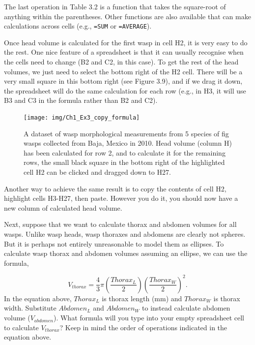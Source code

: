 \documentclass[
]{scrbook}
\begin{document}
The last operation in Table 3.2 is a function that takes the square-root of anything within the parentheses.
Other functions are also available that can make calculations across cells (e.g., \texttt{=SUM} or \texttt{=AVERAGE}).

Once head volume is calculated for the first wasp in cell H2, it is very easy to do the rest.
One nice feature of a spreadsheet is that it can usually recognise when the cells need to change (B2 and C2, in this case).
To get the rest of the head volumes, we just need to select the bottom right of the H2 cell.
There will be a very small square in this bottom right (see Figure 3.9), and if we drag it down, the spreadsheet will do the same calculation for each row (e.g., in H3, it will use B3 and C3 in the formula rather than B2 and C2).

\begin{figure}
\texttt{[image: img/Ch1\_Ex3\_copy\_formula]} \caption{A dataset of wasp morphological measurements from 5 species of fig wasps collected from Baja, Mexico in 2010. Head volume (column H) has been calculated for row 2, and to calculate it for the remaining rows, the small black square in the bottom right of the highlighted cell H2 can be clicked and dragged down to H27.}\label{fig:unnamed-chunk-19}
\end{figure}

Another way to achieve the same result is to copy the contents of cell H2, highlight cells H3-H27, then paste.
However you do it, you should now have a new column of calculated head volume.

Next, suppose that we want to calculate thorax and abdomen volumes for all wasps.
Unlike wasp heads, wasp thoraxes and abdomens are clearly not spheres.
But it is perhaps not entirely unreasonable to model them as ellipses.
To calculate wasp thorax and abdomen volumes assuming an ellipse, we can use the formula,

\[V_{thorax} = \frac{4}{3}\pi \left(\frac{Thorax_{L}}{2}\right)\left(\frac{Thorax_{W}}{2}\right)^{2}.\]
In the equation above, \(Thorax_{L}\) is thorax length (mm) and \(Thorax_{W}\) is thorax width.
Substitute \(Abdomen_{L}\) and \(Abdomen_{W}\) to instead calculate abdomen volume (\(V_{abdomen}\)).
What formula will you type into your empty spreadsheet cell to calculate \(V_{thorax}\)?
Keep in mind the order of operations indicated in the equation above.

\begin{verbatim}




\end{verbatim}
\end{document}
